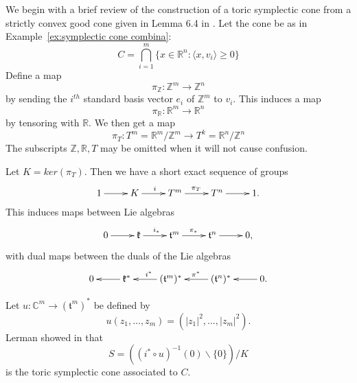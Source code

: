 \documentclass[12pt]{amsart}
\theoremstyle{definition}
\numberwithin{equation}{section}
\begin{document}
We begin with a brief review of the construction of a toric
symplectic cone from a strictly convex good cone given in Lemma 6.4
in \cite{L:contact toric}. Let the cone be as in
Example~\ref{ex:symplectic cone combina}:
 \begin{equation}
  C= \bigcap_{i=1}^{m}\{x\in {{\mathbb{R}}}^n: \langle x, v_{i}\rangle \geq 0\}
\end{equation}
Define a map
\begin{equation}\label{eq:pi_Z contact}
\pi_{{\mathbb{Z}}}: {{\mathbb{Z}}}^m\rightarrow {{\mathbb{Z}}}^n
\end{equation}
by sending the $i^{th}$ standard basis vector $e_{i}$ of ${{\mathbb{Z}}}^m$ to
$v_{i}$. This induces a map
\begin{equation}
\pi_{{\mathbb{R}}}: {{\mathbb{R}}}^m\rightarrow {{\mathbb{R}}}^n
\end{equation}
by tensoring with ${{\mathbb{R}}}$. We then get a map
\begin{equation}\label{eq:pi_T contact}
\pi_{T}: T^m={{\mathbb{R}}}^m/{{\mathbb{Z}}}^m \rightarrow T^k={{\mathbb{R}}}^n/{{\mathbb{Z}}}^n
\end{equation}
The subscripts ${{\mathbb{Z}}},{{\mathbb{R}}},T$ may be omitted when it will not cause
confusion.

Let $K=ker (\pi_{T})$. Then we have a short exact sequence of groups
\begin{equation}\label{eq:KT^mT^n}
\xymatrix{
  1 \ar[r]^{} & K \ar[r]^{i} & T^m \ar[r]^{\pi_{T}} & T^n \ar[r]^{} & 1 .   }
\end{equation}
This induces maps between Lie algebras
\begin{equation}
\xymatrix{
  0 \ar[r]^{} & \mathfrak{k} \ar[r]^{i_{*}} & \mathfrak{t}^m \ar[r]^{\pi_{*}} & \mathfrak{t}^n \ar[r]^{} & 0 ,  }
\end{equation}
with dual maps between the duals of the Lie algebras
\begin{equation}\xymatrix{0 & \mathfrak{k}^*\ar[l]^{} &
(\mathfrak{t}^m)^* \ar[l]_{i^*}& (\mathfrak{t}^n)^*\ar[l]_{\pi^*}& 0
.\ar[l]}
\end{equation}

Let $u:{{\mathbb{C}}}^m\rightarrow (\mathfrak{t}^m)^*$ be defined by
\begin{equation}\label{eq:std moment contact}
u(z_{1},...,z_{m})=(|z_{1}|^2,...,|z_{m}|^2).
\end{equation}
Lerman showed in \cite{L:contact toric} that
\begin{equation} S=((i^{*}\circ u)^{-1}(0)\backslash \{0\})/K
\end{equation} is the toric symplectic cone associated to
$C$.
\end{document}
